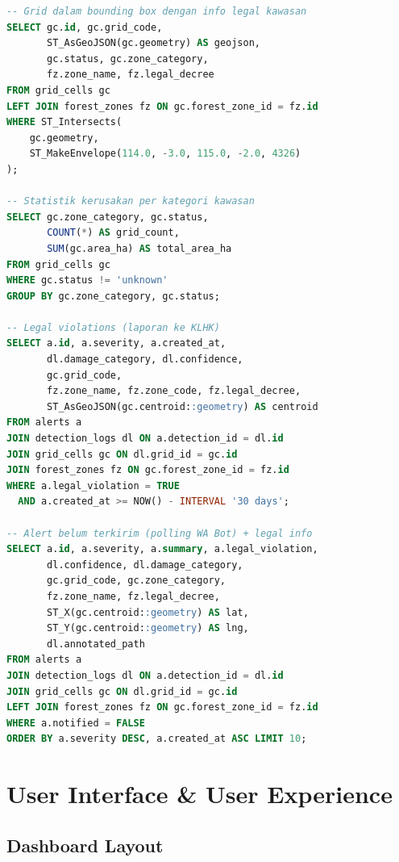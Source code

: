 \documentclass[11pt,a4paper]{article}
\begin{document}
\begin{lstlisting}[language=SQL, caption={Query dengan overlay kawasan hutan}]
-- Grid dalam bounding box dengan info legal kawasan
SELECT gc.id, gc.grid_code,
       ST_AsGeoJSON(gc.geometry) AS geojson,
       gc.status, gc.zone_category,
       fz.zone_name, fz.legal_decree
FROM grid_cells gc
LEFT JOIN forest_zones fz ON gc.forest_zone_id = fz.id
WHERE ST_Intersects(
    gc.geometry,
    ST_MakeEnvelope(114.0, -3.0, 115.0, -2.0, 4326)
);

-- Statistik kerusakan per kategori kawasan
SELECT gc.zone_category, gc.status,
       COUNT(*) AS grid_count,
       SUM(gc.area_ha) AS total_area_ha
FROM grid_cells gc
WHERE gc.status != 'unknown'
GROUP BY gc.zone_category, gc.status;

-- Legal violations (laporan ke KLHK)
SELECT a.id, a.severity, a.created_at,
       dl.damage_category, dl.confidence,
       gc.grid_code,
       fz.zone_name, fz.zone_code, fz.legal_decree,
       ST_AsGeoJSON(gc.centroid::geometry) AS centroid
FROM alerts a
JOIN detection_logs dl ON a.detection_id = dl.id
JOIN grid_cells gc ON dl.grid_id = gc.id
JOIN forest_zones fz ON gc.forest_zone_id = fz.id
WHERE a.legal_violation = TRUE
  AND a.created_at >= NOW() - INTERVAL '30 days';

-- Alert belum terkirim (polling WA Bot) + legal info
SELECT a.id, a.severity, a.summary, a.legal_violation,
       dl.confidence, dl.damage_category,
       gc.grid_code, gc.zone_category,
       fz.zone_name, fz.legal_decree,
       ST_X(gc.centroid::geometry) AS lat,
       ST_Y(gc.centroid::geometry) AS lng,
       dl.annotated_path
FROM alerts a
JOIN detection_logs dl ON a.detection_id = dl.id
JOIN grid_cells gc ON dl.grid_id = gc.id
LEFT JOIN forest_zones fz ON gc.forest_zone_id = fz.id
WHERE a.notified = FALSE
ORDER BY a.severity DESC, a.created_at ASC LIMIT 10;
\end{lstlisting}

\section{User Interface \& User Experience}

\subsection{Dashboard Layout}
\end{document}

